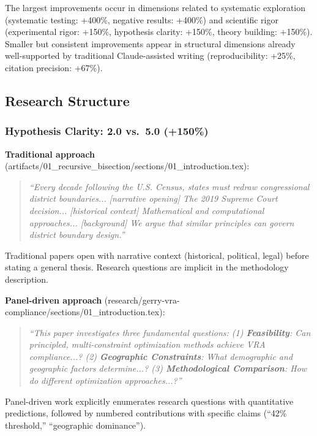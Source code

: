 The largest improvements occur in dimensions related to systematic exploration (systematic testing: +400\%, negative results: +400\%) and scientific rigor (experimental rigor: +150\%, hypothesis clarity: +150\%, theory building: +150\%). Smaller but consistent improvements appear in structural dimensions already well-supported by traditional Claude-assisted writing (reproducibility: +25\%, citation precision: +67\%).

\subsection{Research Structure}

\subsubsection{Hypothesis Clarity: 2.0 vs.\ 5.0 (+150\%)}

\textbf{Traditional approach} (artifacts/01\_recursive\_bisection/sections/01\_introduction.tex):

\begin{quote}
\textit{``Every decade following the U.S. Census, states must redraw congressional district boundaries... [narrative opening] The 2019 Supreme Court decision... [historical context] Mathematical and computational approaches... [background] We argue that similar principles can govern district boundary design.''}
\end{quote}

Traditional papers open with narrative context (historical, political, legal) before stating a general thesis. Research questions are implicit in the methodology description.

\textbf{Panel-driven approach} (research/gerry-vra-compliance/sections/01\_introduction.tex):

\begin{quote}
\textit{``This paper investigates three fundamental questions: (1) \textbf{Feasibility}: Can principled, multi-constraint optimization methods achieve VRA compliance...? (2) \textbf{Geographic Constraints}: What demographic and geographic factors determine...? (3) \textbf{Methodological Comparison}: How do different optimization approaches...?''}
\end{quote}

Panel-driven work explicitly enumerates research questions with quantitative predictions, followed by numbered contributions with specific claims (``42\% threshold,'' ``geographic dominance'').

